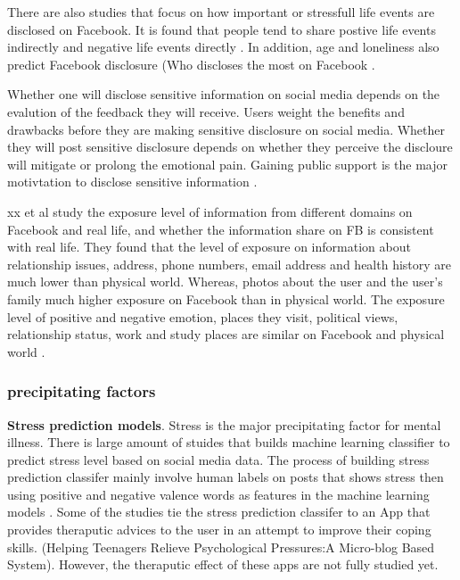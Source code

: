 There are also studies that focus on how important or stressfull life events are disclosed on Facebook. It is found that people tend to share postive life events indirectly and negative life events directly \cite{bevan_how_2015}. In addition, age and loneliness also predict Facebook disclosure (Who discloses the most on Facebook \cite{malik2016uses}.

Whether one will disclose sensitive information on social media depends on the evalution of the feedback they will receive. Users weight the benefits and drawbacks before they are making sensitive disclosure on social media. Whether they will post sensitive disclosure depends on whether they perceive the discloure will mitigate or prolong the emotional pain. Gaining public support is the major motivtation to disclose sensitive information \cite{vitak2017benefits}. 


xx et al study the exposure level of information from different domains on Facebook and real life, and whether the information share on FB is consistent with real life. They found that the level of exposure on information about relationship issues, address, phone numbers, email address and health history are much lower than physical world. Whereas, photos about the user and the user's family much higher exposure on Facebook than in physical world. The exposure level of positive and negative emotion, places they visit, political views, relationship status, work and study places are similar on Facebook and physical world \cite{villela2015contrasting}.


\subsubsection{precipitating factors}


\textbf{Stress prediction models}. Stress is the major precipitating factor for mental illness. There is large amount of stuides that builds machine learning classifier to predict stress level based on social media data. The process of building stress prediction classifer mainly involve human labels on posts that shows stress then using positive and negative valence words as features in the machine learning models \cite{thelwall2017tensistrength,mogadala2012twitter,lin2014user}. 
Some of the studies tie the stress prediction classifer to an App that provides theraputic advices to the user in an attempt to improve their coping skills. (Helping Teenagers Relieve Psychological Pressures:A Micro-blog Based System). However, the theraputic effect of these apps are not fully studied yet.


